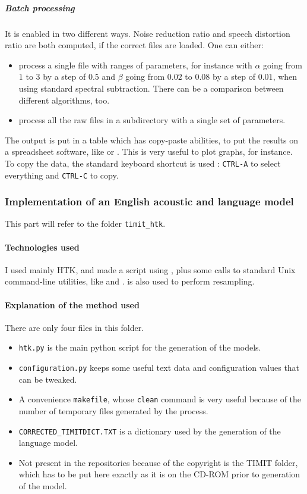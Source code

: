 \subparagraph{Batch processing} It is enabled in two different ways. 
Noise reduction ratio and speech distortion ratio are both computed, if the correct files are loaded.
One can either:
\begin{itemize}
\item process a single file with ranges of parameters, for instance with $\alpha$ going from $1$ to $3$ by a step of $0.5$ and  $\beta$ going from $0.02$ to $0.08$ by a step of $0.01$, when using standard spectral subtraction. There can be a comparison between different algorithms, too.
\item process all the raw files in a subdirectory with a single set of parameters.
\end{itemize}

The output is put in a table which has copy-paste abilities, to put the results on a spreadsheet software, like  or . This is very useful to plot graphs, for instance.
To copy the data, the standard keyboard shortcut is used : \texttt{CTRL-A} to select everything and \texttt{CTRL-C} to copy.
\subsubsection{Implementation of an English acoustic and language model}
This part will refer to the folder \texttt{timit\_htk}. 
\paragraph{Technologies used}
I used mainly \ac{HTK}, and made a script using , plus some calls to standard Unix command-line utilities, like  and .  is also used to perform resampling.
\paragraph{Explanation of the method used}
There are only four files in this folder.
\begin{itemize}
\item \texttt{htk.py} is the main python script for the generation of the models.
\item \texttt{configuration.py} keeps some useful text data and configuration values that can be tweaked.
\item A convenience \texttt{makefile}, whose \texttt{clean} command is very useful because of the number of temporary files generated by the process.
\item \texttt{CORRECTED\_TIMITDICT.TXT} is a dictionary used by the generation of the language model.
\item Not present in the repositories because of the copyright is the \ac{TIMIT} folder, which has to be put here exactly as it is on the CD-ROM prior to generation of the model.
\end{itemize}

